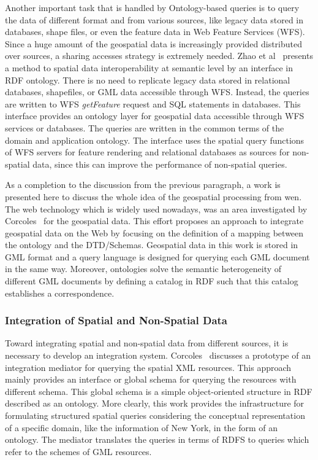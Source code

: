 \documentclass[a4paper,12pt]{article}
\begin{document}
Another important task that is handled by Ontology-based queries is to query 
the data of different format and from various sources,
like legacy data stored in databases, shape files, 
or even the feature data in Web Feature Services (WFS).
Since a huge amount of the geospatial data is increasingly provided
distributed over sources,
a sharing accesses strategy is extremely needed.
Zhao et al~\cite{Zhao2008} presents a method to spatial data 
interoperability at semantic level by an interface in RDF ontology. 
There is no need to replicate legacy data stored in relational databases, shapefiles, or GML data accessible through WFS. Instead, the queries are written to WFS \textit{getFeature} request and SQL statements in databases. 
This interface provides an ontology layer for geospatial data accessible through WFS services or databases. 
The queries are written in the common terms of the domain and application ontology. 
The interface uses the spatial query functions of WFS servers for feature rendering and relational databases as sources for non-spatial data, since this can improve the performance of non-spatial queries. 

As a completion to the discussion from the previous paragraph, a work is presented here to 
discuss the whole idea of the geospatial processing from wen.
The web technology which is widely used nowadays, 
was an area investigated by Corcoles~\cite{corcoles2003} for the geospatial data. 
This effort proposes an approach to integrate geospatial data on the Web by focusing on the definition of a mapping between the ontology and the DTD/Schemas. 
Geospatial data in this work is stored in GML format and a query language is designed for querying each GML document in the same way. 
Moreover, ontologies solve the semantic heterogeneity of different GML documents 
by defining a catalog in RDF such that this catalog establishes a correspondence.

\subsubsection{Integration of Spatial and Non-Spatial Data}
\label{integration}
Toward integrating spatial and non-spatial data from different sources, 
it is necessary to develop an integration system. 
Corcoles~\cite{corcoles2003} discusses a prototype of an integration mediator for querying the spatial XML resources. 
This approach mainly provides an interface or global schema for querying the resources with different schema. 
This global schema is a simple object-oriented structure in RDF described as an ontology. 
More clearly, this work provides the infrastructure for formulating structured spatial queries 
considering the conceptual representation of a specific domain, like the information of New York, 
in the form of an ontology. The mediator translates the queries in terms of RDFS to queries which refer to the schemes of GML resources.
\end{document}
